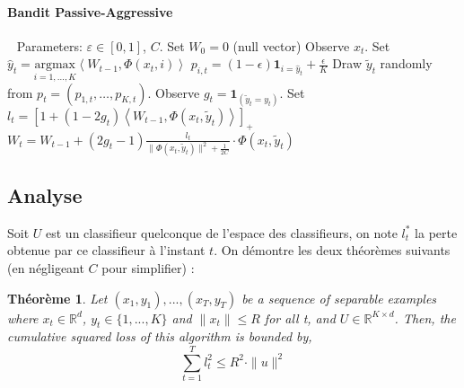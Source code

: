 \documentclass[twocolumn]{article}
\newtheorem{theorem}{Théorème}
\begin{document}
\paragraph{Bandit Passive-Aggressive}
	\begin{algorithmic}
		\STATE $\ \ $
		\STATE Parameters:  $\varepsilon\in [0,1]$, $C$.
		\STATE Set $W_0 = 0$ (null vector)
		\STATE Observe $x_t$.
		\STATE Set $\hat{y}_t = \underset{i = 1,\dots,K}{\text{argmax}}\left\langle W_{t-1} ,\Phi(x_t,i)\right\rangle$
		\STATE $p_{i,t}= (1-\epsilon)\mathbf{1}_{i = \hat{y}_t} + \frac{\epsilon}{K}$
		\ENDFOR
		\STATE Draw $\tilde{y}_t$ randomly from $p_t = \left(p_{1,t},\dots ,p_{K,t}\right)$.
		\STATE Observe $g_t = \mathbf{1}_{(\tilde{y}_t=y_t)}$.
		\STATE Set $l_t = [ 1+(1-2g_t)\left\langle W_{t-1},\Phi(x_t,\tilde{y}_t)\right\rangle]_{+}$ 
		\STATE $W_t = W_{t-1} + (2g_t-1)\frac{l_t}{\parallel\Phi(x_t,\tilde{y}_t)\parallel^2 + \frac{1}{2C}}\cdot\Phi(x_t,\tilde{y}_t)$
		\ENDFOR
	\end{algorithmic}


\subsection{Analyse}
Soit $U$ est un classifieur quelconque de l'espace des classifieurs, on note $l_t^{\ast}$ la perte obtenue par ce classifieur à l'instant $t$. On démontre les deux théorèmes suivants (en négligeant $C$ pour simplifier) :

\begin{theorem}
	\label{theo:BPAT1}
	Let $(x_1,y_1),...,(x_T,y_T)$ be a sequence of separable examples where $x_t \in \mathbb{R}^d$, $y_t\in \{1,...,K\}$ and $\parallel x_t \parallel\leqslant R$ for all t, and $U \in \mathbb{R}^{K\times d}$. Then, the cumulative squared loss of this algorithm is bounded by,
	\begin{equation}
	\sum_{t=1}^{T} l_t^2 \leqslant R^2\cdot \parallel{u}\parallel^2
	\end{equation}
\end{theorem}
\end{document}

